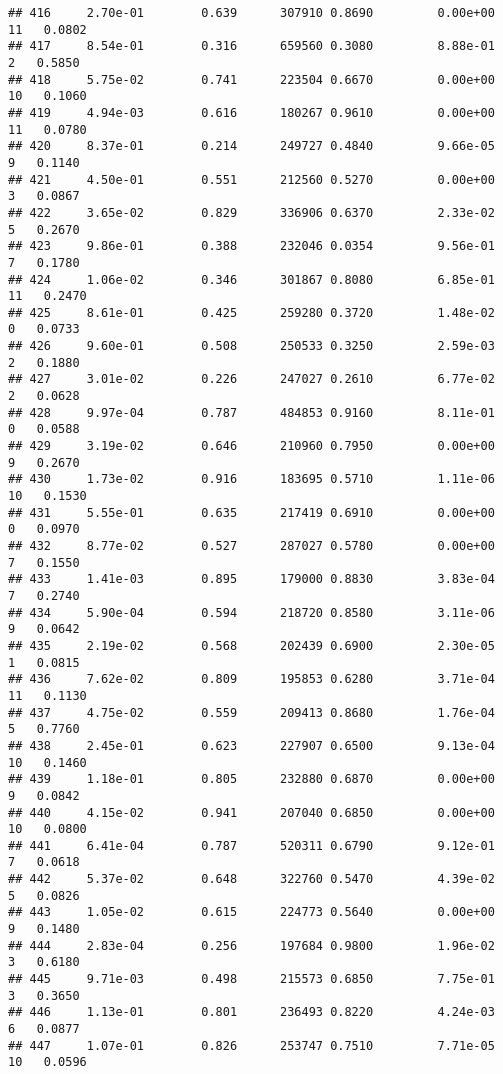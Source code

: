 \documentclass[
]{article}
\begin{document}
\begin{verbatim}
## 416     2.70e-01        0.639      307910 0.8690         0.00e+00  11   0.0802
## 417     8.54e-01        0.316      659560 0.3080         8.88e-01   2   0.5850
## 418     5.75e-02        0.741      223504 0.6670         0.00e+00  10   0.1060
## 419     4.94e-03        0.616      180267 0.9610         0.00e+00  11   0.0780
## 420     8.37e-01        0.214      249727 0.4840         9.66e-05   9   0.1140
## 421     4.50e-01        0.551      212560 0.5270         0.00e+00   3   0.0867
## 422     3.65e-02        0.829      336906 0.6370         2.33e-02   5   0.2670
## 423     9.86e-01        0.388      232046 0.0354         9.56e-01   7   0.1780
## 424     1.06e-02        0.346      301867 0.8080         6.85e-01  11   0.2470
## 425     8.61e-01        0.425      259280 0.3720         1.48e-02   0   0.0733
## 426     9.60e-01        0.508      250533 0.3250         2.59e-03   2   0.1880
## 427     3.01e-02        0.226      247027 0.2610         6.77e-02   2   0.0628
## 428     9.97e-04        0.787      484853 0.9160         8.11e-01   0   0.0588
## 429     3.19e-02        0.646      210960 0.7950         0.00e+00   9   0.2670
## 430     1.73e-02        0.916      183695 0.5710         1.11e-06  10   0.1530
## 431     5.55e-01        0.635      217419 0.6910         0.00e+00   0   0.0970
## 432     8.77e-02        0.527      287027 0.5780         0.00e+00   7   0.1550
## 433     1.41e-03        0.895      179000 0.8830         3.83e-04   7   0.2740
## 434     5.90e-04        0.594      218720 0.8580         3.11e-06   9   0.0642
## 435     2.19e-02        0.568      202439 0.6900         2.30e-05   1   0.0815
## 436     7.62e-02        0.809      195853 0.6280         3.71e-04  11   0.1130
## 437     4.75e-02        0.559      209413 0.8680         1.76e-04   5   0.7760
## 438     2.45e-01        0.623      227907 0.6500         9.13e-04  10   0.1460
## 439     1.18e-01        0.805      232880 0.6870         0.00e+00   9   0.0842
## 440     4.15e-02        0.941      207040 0.6850         0.00e+00  10   0.0800
## 441     6.41e-04        0.787      520311 0.6790         9.12e-01   7   0.0618
## 442     5.37e-02        0.648      322760 0.5470         4.39e-02   5   0.0826
## 443     1.05e-02        0.615      224773 0.5640         0.00e+00   9   0.1480
## 444     2.83e-04        0.256      197684 0.9800         1.96e-02   3   0.6180
## 445     9.71e-03        0.498      215573 0.6850         7.75e-01   3   0.3650
## 446     1.13e-01        0.801      236493 0.8220         4.24e-03   6   0.0877
## 447     1.07e-01        0.826      253747 0.7510         7.71e-05  10   0.0596

\end{verbatim}
\end{document}
